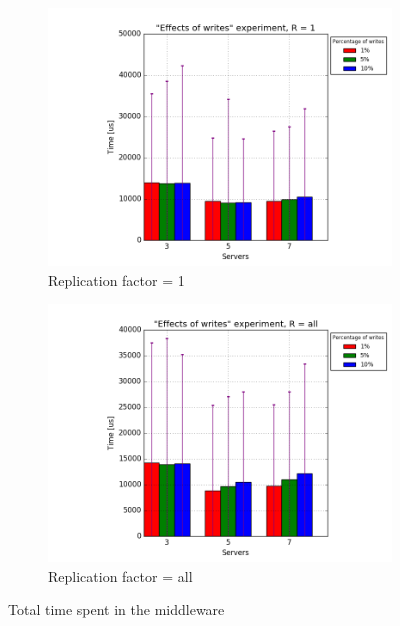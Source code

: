 \documentclass[11pt]{article}
\begin{document}
\begin{figure}
\centering
\begin{subfigure}{.5\textwidth}
	\centering
	\includegraphics[width=\linewidth]{plots/writes-all-1-replication}
	\caption{Replication factor = 1}
	\label{fig:writes-all-1}
\end{subfigure}%
\begin{subfigure}{.5\textwidth}
	\centering
	\includegraphics[width=\linewidth]{plots/writes-all-2-replication}
	\caption{Replication factor = all}
	\label{fig:writes-all-2}
\end{subfigure}
\caption{Total time spent in the middleware}
\label{fig:writes-all}
\end{figure}
\end{document}
